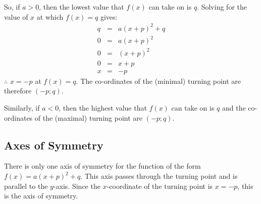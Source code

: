 So, if $a>0$, then the lowest value that $f(x)$ can take on is $q$. Solving for the value of $x$ at which $f(x)=q$ gives:
\begin{eqnarray*}
q&=&a(x+p)^2+q\\
0&=&a(x+p)^2\\
0&=&(x+p)^2\\
0&=&x+p\\
x&=&-p
\end{eqnarray*}
$\therefore$ $x=-p$ at $f(x)=q$. The co-ordinates of the (minimal) turning point are therefore $(-p;q)$.

Similarly, if $a<0$, then the highest value that $f(x)$ can take on is $q$ and the co-ordinates of the (maximal) turning point are $(-p;q)$.


\subsection{Axes of Symmetry}
There is only one axis of symmetry for the function of the form $f(x)=a(x+p)^2+q$. This axis passes through the turning point and is parallel to the $y$-axis. Since the $x$-coordinate of the turning point is $x=-p$, this is the axis of symmetry.



